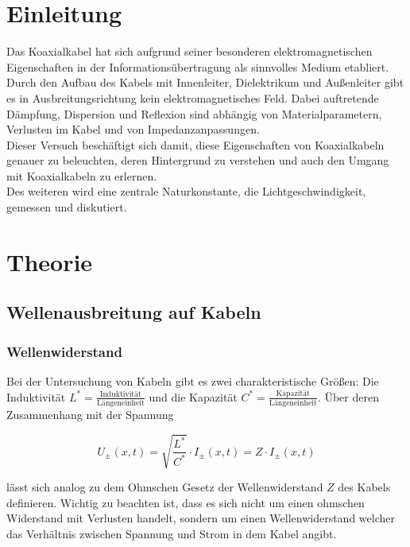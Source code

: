 \documentclass[a4paper,10pt,twocolumn]{scrartcl} %
\begin{document}
\section{Einleitung}

	Das Koaxialkabel hat sich aufgrund seiner besonderen elektromagnetischen Eigenschaften in der Informationsübertragung als sinnvolles Medium etabliert.
	Durch den Aufbau des Kabels mit Innenleiter, Dielektrikum und Außenleiter {gibt es in Ausbreitungsrichtung kein elektromagnetisches Feld.}
	Dabei auftretende Dämpfung, Dispersion und Reflexion sind abhängig von Materialparametern, Verlusten im Kabel und von Impedanzanpassungen. \\
	Dieser Versuch beschäftigt sich damit, diese Eigenschaften von Koaxialkabeln genauer zu beleuchten, deren Hintergrund zu verstehen und auch den Umgang mit Koaxialkabeln
	zu erlernen.\\
	Des weiteren wird eine zentrale Naturkonstante, die Lichtgeschwindigkeit, gemessen und diskutiert.
\section{Theorie}

	\subsection{Wellenausbreitung auf Kabeln}

		\subsubsection{Wellenwiderstand}

			Bei der Untersuchung von Kabeln gibt es zwei charakteristische Größen:
			Die Induktivität $L^{\ast} = \frac{\text{Induktivität}}{\text{Längeneinheit}}$
			und die Kapazität $C^{\ast} = \frac{\text{Kapazität}}{\text{Längeneinheit}}$. Über
			deren Zusammenhang mit der Spannung 

			\begin{displaymath}
				U_{\pm}(x,t) = \sqrt{\frac{L^{\ast}}{C^{\ast}}} \cdot I_{\pm}(x,t) = Z \cdot I_{\pm}(x,t)
			\end{displaymath}
	
			\noindent lässt sich analog zu dem Ohmschen Gesetz der Wellenwiderstand $Z$ des Kabels definieren.
			Wichtig zu beachten ist, dass es sich nicht um einen ohmschen Widerstand mit Verlusten
			handelt, sondern um einen Wellenwiderstand welcher das Verhältnis zwischen
			Spannung und Strom in dem Kabel angibt.
		
\end{document}
